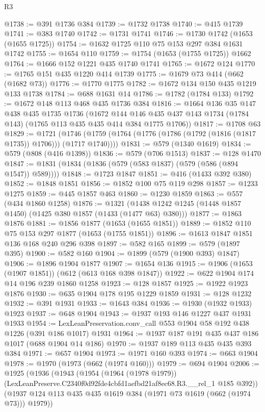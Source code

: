 \begin{lexlean}{R3}
\begin{coremodule}
@1738 := @391 @1736 @384
@1739 := @1732 @1738
@1740 := @415 @1739
@1741 := @383 @1740
@1742 := @1731 @1741
@1746 := @1730 @1742 (@1653 (@1655 @1725))
@1754 := @1632 @1725 @110 @75 @153 @297 @384 @1631 @1742
@1755 := @1654 @110
@1759 := @1754 (@1653 (@1755 @1725)) @1662
@1764 := @1666 @152 @1221 @435 @1740 @1741
@1765 := @1672 @124
@1770 := @1765 @151 @435 @1220 @414 @1739
@1775 := @1679 @73 @414 (@662 (@1682 @73))
@1776 := @1770 @1775
@1782 := @1672 @134 @150 @435 @1219 @133 @1738
@1784 := @688 @1631 @14
@1786 := @1782 (@1784 @133)
@1792 := @1672 @148 @113 @468 @435 @1736 @384
@1816 := @1664
    @136
    @35
    @147
    @438
    @435
    @1735
    @1736
    (@1672 @144 @146 @435 @437 @143 @1734 (@1784 @143) (@1765 @113 @435 @435 @414 @384 @1775 @1706))
@1817 := @1708 @63
@1829 := @1721
    (@1746 (@1759 (@1764 (@1776 (@1786 (@1792 (@1816 (@1817 @1735)) @1706))) (@1717 @1740))))
@1831 := @579 (@1340 @1619)
@1834 := @579 (@808 (@416 @1398))
@1836 := @579 (@706 @1513)
@1837 := @128 @1470
@1847 := @1831 (@1834 (@1836 (@579 (@583 @1837) (@579 (@586 (@894 @1547)) @589))))
@1848 := @1723 @1847
@1851 := @416 (@1433 @392 @380)
@1852 := @1848 @1851
@1856 := @1852 @100 @75 @119 @298
@1857 := @1233 @1275
@1859 := @445 @1857 @463
@1860 := @1230 @1859
@1863 := @557 (@434 @1860 @1258)
@1876 := @1321 (@1438 @1242 @1245 (@1448 @1857 @1450) (@1425 @380 @1857 (@1433 (@1477 @63) @380)))
@1877 := @1863 @1876
@1881 := @1856 @1877 (@1653 (@1655 @1851))
@1889 := @1852 @110 @75 @153 @297 @1877 (@1653 (@1755 @1851))
@1896 := @1613 @1847 @1851 @136 @168 @240 @296 @398
@1897 := @582 @165
@1899 := @579 (@1897 @395)
@1900 := @582 @160
@1904 := @1899 (@579 (@1900 @393) @1847)
@1906 := @1896 @1904 @1877
@1907 := @1654 @136
@1915 := @1906 (@1653 (@1907 @1851)) (@612 (@613 @168 @398 @1847))
@1922 := @622 @1904 @174 @14 @196 @239 @1860 @1258
@1923 := @128 @1857
@1925 := @1922 @1923 @1876
@1930 := @635 @1904 @178 @195 @1229 @1859
@1931 := @128 @1232
@1932 := @391 @1931
@1933 := @1643 @384
@1936 := @1930 (@1932 @1933) @1923
@1937 := @648 @1904
@1943 := @1937 @193 @146 @1227 @437 @1931 @1933
@1954 := LexLeanPreservation.conv_call @553 @1904 @58 @192 @438 @1226 (@391 @186 @1017) @1931
@1964 := @1937 @187 @191 @435 @437 @186 @1017 (@688 @1904 @14 @186)
@1970 := @1937 @189 @113 @435 @435 @393 @384
@1971 := @657 @1904
@1973 := @1971 @160 @393
@1974 := @663 @1904
@1978 := @1970 (@1973 (@662 (@1974 @160)))
@1979 := @694 @1904
@2006 := @1925
    (@1936
      (@1943
        (@1954
          (@1964 (@1978 @1979))
          (LexLeanPreserve.C2340f0d92fde4cbfd1aefbd21af8ec68.R3.__rel_1 @185 @392))
        (@1937 @124 @113 @435 @435 @1619 @384 (@1971 @73 @1619 (@662 (@1974 @73))) @1979))

\end{coremodule}
\end{lexlean}
